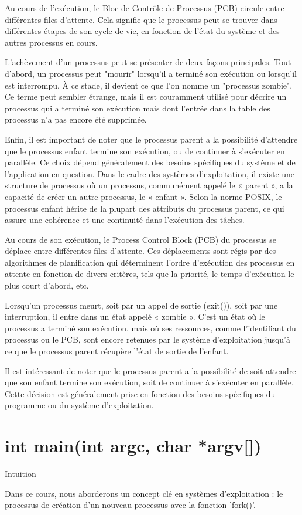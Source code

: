 \documentclass[12pt]{article}
\begin{document}
Au cours de l'exécution, le Bloc de Contrôle de Processus (PCB) circule entre différentes files d'attente. Cela signifie que le processus peut se trouver dans différentes étapes de son cycle de vie, en fonction de l'état du système et des autres processus en cours.

L'achèvement d'un processus peut se présenter de deux façons principales. Tout d'abord, un processus peut "mourir" lorsqu'il a terminé son exécution ou lorsqu'il est interrompu. À ce stade, il devient ce que l'on nomme un "processus zombie". Ce terme peut sembler étrange, mais il est couramment utilisé pour décrire un processus qui a terminé son exécution mais dont l'entrée dans la table des processus n'a pas encore été supprimée.

Enfin, il est important de noter que le processus parent a la possibilité d'attendre que le processus enfant termine son exécution, ou de continuer à s'exécuter en parallèle. Ce choix dépend généralement des besoins spécifiques du système et de l'application en question.
Dans le cadre des systèmes d'exploitation, il existe une structure de processus où un processus, communément appelé le « parent », a la capacité de créer un autre processus, le « enfant ». Selon la norme POSIX, le processus enfant hérite de la plupart des attributs du processus parent, ce qui assure une cohérence et une continuité dans l'exécution des tâches.

Au cours de son exécution, le Process Control Block (PCB) du processus se déplace entre différentes files d'attente. Ces déplacements sont régis par des algorithmes de planification qui déterminent l'ordre d'exécution des processus en attente en fonction de divers critères, tels que la priorité, le temps d'exécution le plus court d'abord, etc.

Lorsqu'un processus meurt, soit par un appel de sortie (exit()), soit par une interruption, il entre dans un état appelé « zombie ». C'est un état où le processus a terminé son exécution, mais où ses ressources, comme l'identifiant du processus ou le PCB, sont encore retenues par le système d'exploitation jusqu'à ce que le processus parent récupère l'état de sortie de l'enfant.

Il est intéressant de noter que le processus parent a la possibilité de soit attendre que son enfant termine son exécution, soit de continuer à s'exécuter en parallèle. Cette décision est généralement prise en fonction des besoins spécifiques du programme ou du système d'exploitation.
\section{int main(int argc, char *argv[])}
\begin{myvulga}{Intuition}
\end{myvulga}
Dans ce cours, nous aborderons un concept clé en systèmes d'exploitation : le processus de création d'un nouveau processus avec la fonction 'fork()'. 
\end{document}
